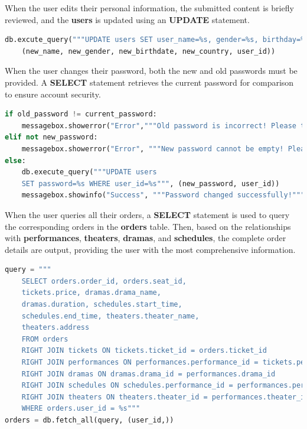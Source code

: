 \documentclass[12pt]{article}
\begin{document}
\par When the user edits their personal information, the submitted content is briefly reviewed, and the \textbf{users} is updated using an \textbf{UPDATE} statement. 
\begin{tcolorbox}[colframe=black, colback=white, boxrule=0.4mm, sharp corners=southwest, title=Excerpt of Edit Personal Info Code]
    \begin{lstlisting}[language=Python, breaklines=true]
db.excute_query("""UPDATE users SET user_name=%s, gender=%s, birthday=%s, country=%s WHERE user_id=%s""", 
    (new_name, new_gender, new_birthdate, new_country, user_id))
\end{lstlisting}
\end{tcolorbox}

\par When the user changes their password, both the new and old passwords must be provided. A \textbf{SELECT} statement retrieves the current password for comparison to ensure account security.
\begin{tcolorbox}[colframe=black, colback=white, boxrule=0.4mm, sharp corners=southwest, title=Excerpt of Edit Password Code]
    \begin{lstlisting}[language=Python, breaklines=true]
if old_password != current_password:
    messagebox.showerror("Error","""Old password is incorrect! Please try again.""")
elif not new_password: 
    messagebox.showerror("Error", """New password cannot be empty! Please try again.""")
else: 
    db.execute_query("""UPDATE users 
    SET password=%s WHERE user_id=%s""", (new_password, user_id))
    messagebox.showinfo("Success", """Password changed successfully!""")
\end{lstlisting}
\end{tcolorbox}

\par When the user queries all their orders, a \textbf{SELECT} statement is used to query the corresponding orders in the \textbf{orders} table. Then, based on the relationships with \textbf{performances}, \textbf{theaters}, \textbf{dramas}, and \textbf{schedules}, the complete order details are output, providing the user with the most comprehensive information.
\begin{tcolorbox}[colframe=black, colback=white, boxrule=0.4mm, sharp corners=southwest, title=Excerpt of Search Personal Orders Code]
    \begin{lstlisting}[language=Python, breaklines=true]
query = """
    SELECT orders.order_id, orders.seat_id, 
    tickets.price, dramas.drama_name, 
    dramas.duration, schedules.start_time, 
    schedules.end_time, theaters.theater_name, 
    theaters.address  
    FROM orders
    RIGHT JOIN tickets ON tickets.ticket_id = orders.ticket_id
    RIGHT JOIN performances ON performances.performance_id = tickets.performance_id
    RIGHT JOIN dramas ON dramas.drama_id = performances.drama_id
    RIGHT JOIN schedules ON schedules.performance_id = performances.performance_id
    RIGHT JOIN theaters ON theaters.theater_id = performances.theater_id
    WHERE orders.user_id = %s"""
orders = db.fetch_all(query, (user_id,))
\end{lstlisting}
\end{tcolorbox}
\end{document}
